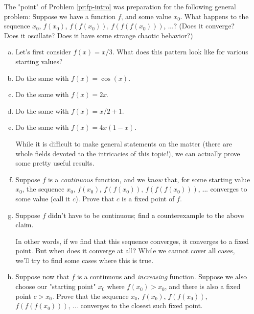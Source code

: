 \begin{problem}


The "point" of Problem \ref{pr:fp-intro} was preparation for the following general problem: Suppose we have a function $f$, and some value $x_0$. What happens to the sequence $x_0$, $f(x_0)$, $f(f(x_0))$, $f(f(f(x_0)))$, ...? (Does it converge? Does it oscillate? Does it have some strange chaotic behavior?)

\begin{enumerate}[(a)]
\item Let's first consider $f(x) = x/3$. What does this pattern look like for various starting values?
\item Do the same with $f(x) = \cos(x)$.
\item Do the same with $f(x) = 2x$. 
\item Do the same with $f(x) = x/2 + 1$. 
\item Do the same with $f(x) = 4x(1-x)$. %

While it is difficult to make general statements on the matter (there are whole fields devoted to the intricacies of this topic!), we can actually prove some pretty useful results.


\item Suppose $f$ is a \emph{continuous} function, and we \emph{know} that, for some starting value $x_0$, the sequence $x_0$, $f(x_0)$, $f(f(x_0))$, $f(f(f(x_0)))$, ... converges to some value (call it $c$). Prove that $c$ is a fixed point of $f$.
\item Suppose $f$ didn't have to be continuous; find a counterexample to the above claim.

In other words, if we find that this sequence converges, it converges to a fixed point. But when does it converge at all? While we cannot cover all cases, we'll try to find some cases where this is true.


\item Suppose now that $f$ is a continuous and \emph{increasing} function. Suppose we also choose our "starting point" $x_0$ where $f(x_0) > x_0$, and there is also a fixed point $c > x_0$. Prove that the sequence $x_0$, $f(x_0)$, $f(f(x_0))$, $f(f(f(x_0)))$, ... converges to the closest such fixed point. 




\end{enumerate}
\end{problem}


